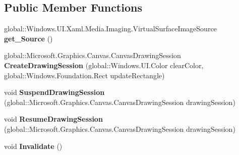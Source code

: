 \subsection*{Public Member Functions}
\begin{DoxyCompactItemize}
\item 
\mbox{\label{interface_microsoft_1_1_graphics_1_1_canvas_1_1_u_i_1_1_xaml_1_1_i_canvas_virtual_image_source_acbb06ee7976aaed52d3b36b37daabb4b}} 
global\+::\+Windows.\+U\+I.\+Xaml.\+Media.\+Imaging.\+Virtual\+Surface\+Image\+Source {\bfseries get\+\_\+\+Source} ()
\item 
\mbox{\label{interface_microsoft_1_1_graphics_1_1_canvas_1_1_u_i_1_1_xaml_1_1_i_canvas_virtual_image_source_a0dca36de10b0621fa57400291c8ac8e0}} 
global\+::\+Microsoft.\+Graphics.\+Canvas.\+Canvas\+Drawing\+Session {\bfseries Create\+Drawing\+Session} (global\+::\+Windows.\+U\+I.\+Color clear\+Color, global\+::\+Windows.\+Foundation.\+Rect update\+Rectangle)
\item 
\mbox{\label{interface_microsoft_1_1_graphics_1_1_canvas_1_1_u_i_1_1_xaml_1_1_i_canvas_virtual_image_source_a04c5d24777624a8eeb7d282703e2f97a}} 
void {\bfseries Suspend\+Drawing\+Session} (global\+::\+Microsoft.\+Graphics.\+Canvas.\+Canvas\+Drawing\+Session drawing\+Session)
\item 
\mbox{\label{interface_microsoft_1_1_graphics_1_1_canvas_1_1_u_i_1_1_xaml_1_1_i_canvas_virtual_image_source_a501ef07bf7ed03a1dbaf87016f789ac5}} 
void {\bfseries Resume\+Drawing\+Session} (global\+::\+Microsoft.\+Graphics.\+Canvas.\+Canvas\+Drawing\+Session drawing\+Session)
\item 
\mbox{\label{interface_microsoft_1_1_graphics_1_1_canvas_1_1_u_i_1_1_xaml_1_1_i_canvas_virtual_image_source_a73580d63c0dbcf49067c8188bbc17f11}} 
void {\bfseries Invalidate} ()
\item 

\end{DoxyCompactItemize}
